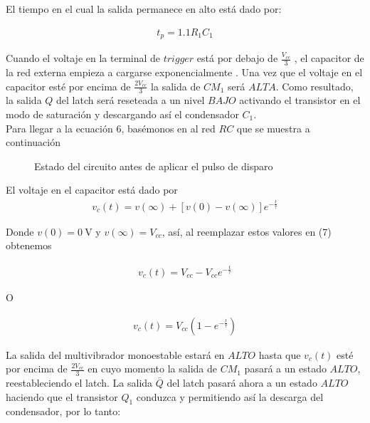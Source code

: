\documentclass{article}
\begin{document}
\noindent El tiempo en el cual la salida permanece en alto está dado por:

\begin{align}
	t_p = 1.1 R_1C_1
\end{align}

\noindent Cuando el voltaje en la terminal de $trigger$ está por debajo de $\frac{V_{cc}}{3}$ , el capacitor de la red externa empieza a cargarse exponencialmente . Una vez que el voltaje en el capacitor esté por encima de $\frac{2V_{cc}}{3}$ la salida de $CM_1$ será $ALTA$. Como resultado, la salida $Q$ del latch será reseteada a un nivel $BAJO$ activando el transistor en el modo de saturación y descargando así el condensador $C_1$. \\

\noindent Para llegar a la ecuación 6, basémonos en al red $RC$ que se muestra a continuación  
\begin{figure}[H]
	\centering
	\caption{Estado del circuito antes de aplicar el pulso de disparo}	
	\label{fig:figura9}
\end{figure}

\noindent El voltaje en el capacitor está dado por 
\begin{align}
	v_c(t) = v(\infty) + \left[ v(0) - v(\infty) \right]e^{-\frac{t}{\tau}}
\end{align}

\noindent Donde $v(0) = \qty{0}{\volt}$ y $v(\infty) = V_{cc}$, así, al reemplazar estos valores en (7) obtenemos

\begin{align}
	v_c(t) = V_{cc} - V_{cc}e^{-\frac{t}{\tau}}
\end{align}

\noindent O

\begin{align}
	v_c(t) = V_{cc}(1 - e^{-\frac{t}{\tau}})
\end{align}

\noindent La salida del multivibrador monoestable estará en $ALTO$ hasta que $v_c(t)$ esté por encima de $\frac{2V_{cc}}{3}$ en cuyo momento la salida de $CM_1$ pasará a un estado $ALTO$, reestableciendo el latch. La salida $\bar{Q}$ del latch pasará ahora a un estado $ALTO$ haciendo que el transistor $Q_1$ conduzca y permitiendo así la descarga del condensador, por lo tanto:
\end{document}
